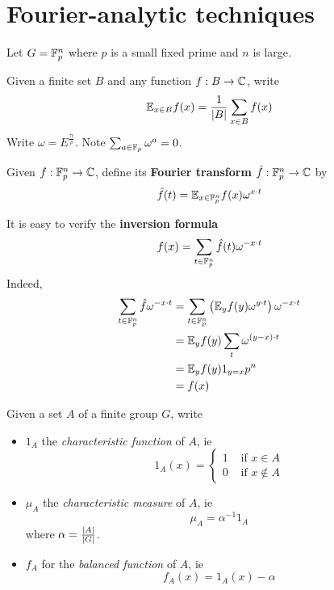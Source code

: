 \documentclass{article}
\begin{document}
\maketitle

\tableofcontents

\clearpage
\section{Fourier-analytic techniques}

\newlec

Let $G = \mathbb F_p^n$ where $p$ is a small fixed prime and $n$ is large.

\begin{notation}
  Given a finite set $B$ and any function $f : B \to \mathbb C$, write
  $$\mathbb E_{x \in B} f(x) = \frac 1{\left\lvert B\right\rvert} \sum_{x \in B} f(x)$$
  Write $\omega = E^{\frac{\tau i}p}$. Note $\sum_{a \in \mathbb F_p} \omega^a = 0$.
\end{notation}

\begin{ndef}
  Given $f : \mathbb F_p^n \to \mathbb C$, define its {\bf Fourier transform} $\hat f : \mathbb F_p^n \to \mathbb C$ by
  $$\hat f(t) = \mathbb E_{x \in \mathbb F_p^n} f(x) \omega^{x \cdot t}$$
\end{ndef}

It is easy to verify the {\bf inversion formula}
$$f(x) = \sum_{t \in \mathbb F_p^n} \hat f(t)\omega^{-x \cdot t}$$
Indeed,
\begin{align*}
  \sum_{t \in \mathbb F_p^n} \hat f \omega^{-x \cdot t}
  & = \sum_{t \in \mathbb F_p^n} \left(\mathbb E_y f(y)\omega^{y \cdot t}\right) \omega^{-x \cdot t} \\
  & = \mathbb E_y f(y) \sum_t \omega^{(y - x) \cdot t} \\
  & = \mathbb E_y f(y) 1_{y = x} p^n \\
  & = f(x)
\end{align*}

\begin{notation}
  Given a set $A$ of a finite group $G$, write
  \begin{itemize}
    \item $1_A$ the {\it characteristic function} of $A$, ie
    $$1_A(x) = \begin{cases}
      1 & \text{ if } x \in A \\
      0 & \text{ if } x \nin A
    \end{cases}$$
    \item $\mu_A$ the {\it characteristic measure} of $A$, ie
    $$\mu_A = \alpha^{-1} 1_A$$
    where $\alpha = \frac{\left\lvert A\right\rvert}{\left\lvert G\right\rvert}$.
    \item $f_A$ for the {\it balanced function} of $A$, ie
    $$f_A(x) = 1_A(x) - \alpha$$
  \end{itemize}
\end{notation}
\end{document}
